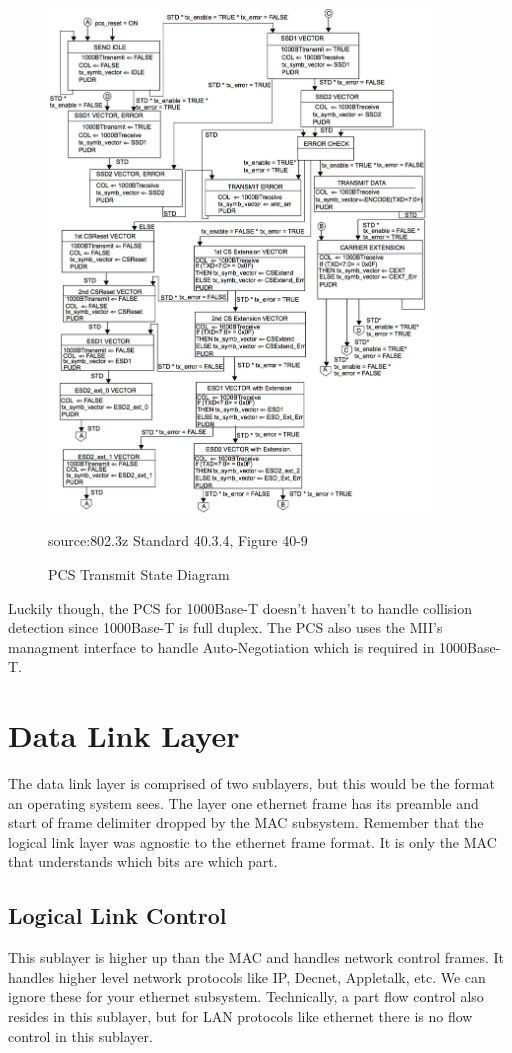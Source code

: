 \documentclass[12pt]{report}
\begin{document}
\begin{figure}[H]
\centering
\includegraphics[width=4in]{pcs_transmit}
\caption{PCS Transmit State Diagram}
\small source:{802.3z Standard 40.3.4, Figure 40-9} \cite{802.3z}
\label{fig:pcs_transmit}
\end{figure}

Luckily though, the PCS for 1000Base-T doesn't haven't to handle collision detection since
1000Base-T is full duplex.
The PCS also uses the MII's managment interface to handle Auto-Negotiation which is required
in 1000Base-T.

\section{Data Link Layer}
The data link layer is comprised of two sublayers,
but this would be the format an operating system sees.
The layer one ethernet frame has its preamble and start of frame delimiter dropped by the MAC subsystem. Remember that the logical link layer was agnostic to the ethernet frame format.
It is only the MAC that understands which bits are which part.
\subsection{Logical Link Control}
This sublayer is higher up than the MAC and handles network control frames. It handles higher level network protocols like IP, Decnet, Appletalk, etc. We can ignore these for your ethernet subsystem.
Technically, a part flow control also resides in this sublayer,
but for LAN protocols like ethernet there is no flow control in this sublayer.
\end{document}
